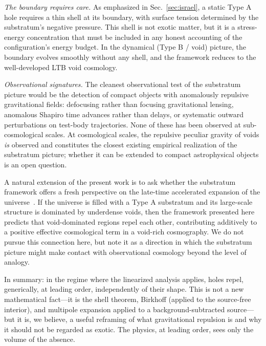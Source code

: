 \documentclass[%
  reprint,
  superscriptaddress,
  showpacs,
  showkeys,
  amsmath,amssymb,
  pra,
  longbibliography,
  floatfix,
  x11names
]{revtex4-2}
\begin{document}
\emph{The boundary requires care.} As emphasized in Sec.~\ref{sec:israel}, a static Type A hole requires a thin shell at its boundary, with surface tension determined by the substratum's negative pressure. This shell is not exotic matter, but it is a stress-energy concentration that must be included in any honest accounting of the configuration's energy budget. In the dynamical (Type B / void) picture, the boundary evolves smoothly without any shell, and the framework reduces to the well-developed LTB void cosmology.

\emph{Observational signatures.} The cleanest observational test of the substratum picture would be the detection of compact objects with anomalously repulsive gravitational fields: defocusing rather than focusing gravitational lensing, anomalous Shapiro time advances rather than delays, or systematic outward perturbations on test-body trajectories. None of these has been observed at sub-cosmological scales. At cosmological scales, the repulsive peculiar gravity of voids \emph{is} observed and constitutes the closest existing empirical realization of the substratum picture; whether it can be extended to compact astrophysical objects is an open question.

A natural extension of the present work is to ask whether the substratum framework offers a fresh perspective on the late-time accelerated expansion of the universe~\cite{Riess1998,Perlmutter1999}. If the universe is filled with a Type A substratum and its large-scale structure is dominated by underdense voids, then the framework presented here predicts that void-dominated regions repel each other, contributing additively to a positive effective cosmological term in a void-rich cosmography. We do not pursue this connection here, but note it as a direction in which the substratum picture might make contact with observational cosmology beyond the level of analogy.

In summary: in the regime where the linearized analysis applies, holes repel, generically, at leading order, independently of their shape. This is not a new mathematical fact---it is the shell theorem, Birkhoff (applied to the source-free interior), and multipole expansion applied to a background-subtracted source---but it is, we believe, a useful reframing of what gravitational repulsion is and why it should not be regarded as exotic. The physics, at leading order, sees only the volume of the absence.
\end{document}
